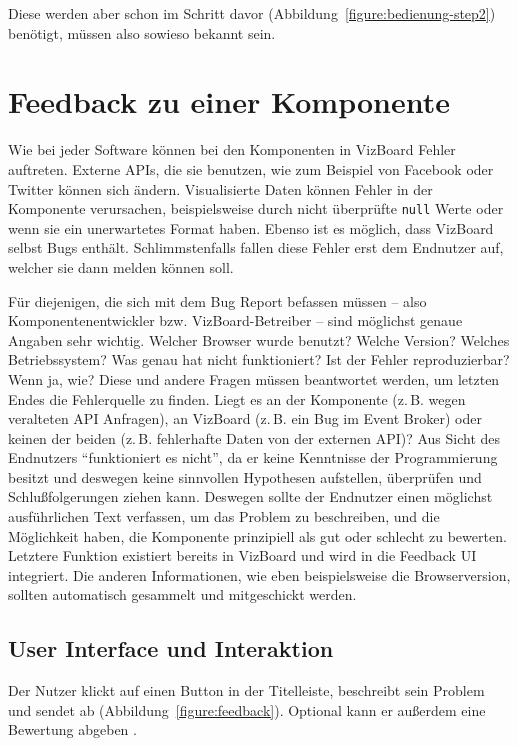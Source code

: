 \documentclass[
	headsepline,
	footsepline,
	fontsize=12pt,
	bibliography=totoc
]{scrbook}
\begin{document}
Diese werden aber schon im Schritt davor (Abbildung~\ref{figure:bedienung-step2}) benötigt, müssen also sowieso bekannt sein.

\section{Feedback zu einer Komponente}
\label{section:konzeption:feedback}

Wie bei jeder Software können bei den Komponenten in VizBoard Fehler auftreten. Externe APIs, die sie benutzen, wie zum Beispiel von Facebook oder Twitter können sich ändern. Visualisierte Daten können Fehler in der Komponente verursachen, beispielsweise durch nicht überprüfte \texttt{null} Werte oder wenn sie ein unerwartetes Format haben. Ebenso ist es möglich, dass VizBoard selbst Bugs enthält. Schlimmstenfalls fallen diese Fehler erst dem Endnutzer auf, welcher sie dann melden können soll.

Für diejenigen, die sich mit dem Bug Report befassen müssen -- also Komponentenentwickler bzw. VizBoard-Betreiber -- sind möglichst genaue Angaben sehr wichtig. Welcher Browser wurde benutzt? Welche Version? Welches Betriebssystem? Was genau hat nicht funktioniert? Ist der Fehler reproduzierbar? Wenn ja, wie? Diese und andere Fragen müssen beantwortet werden, um letzten Endes die Fehlerquelle zu finden. Liegt es an der Komponente (z.\,B. wegen veralteten API Anfragen), an VizBoard (z.\,B. ein Bug im Event Broker) oder keinen der beiden (z.\,B. fehlerhafte Daten von der externen API)? Aus Sicht des Endnutzers \enquote{funktioniert es nicht}, da er keine Kenntnisse der Programmierung besitzt und deswegen keine sinnvollen Hypothesen aufstellen, überprüfen und Schlußfolgerungen ziehen kann. Deswegen sollte der Endnutzer einen möglichst ausführlichen Text verfassen, um das Problem zu beschreiben, und die Möglichkeit haben, die Komponente prinzipiell als gut oder schlecht zu bewerten. Letztere Funktion existiert bereits in VizBoard und wird in die Feedback UI integriert. Die anderen Informationen, wie eben beispielsweise die Browserversion, sollten automatisch gesammelt und mitgeschickt werden.

\subsection{User Interface und Interaktion}
\label{section:konzeption:feedback:ui}

Der Nutzer klickt auf einen Button in der Titelleiste, beschreibt sein Problem und sendet ab (Abbildung~\ref{figure:feedback}). Optional kann er außerdem eine Bewertung abgeben \cite{Voigt2013b}.
\end{document}
